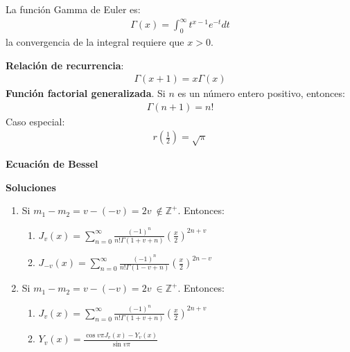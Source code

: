 \documentclass[a4paper,12pt]{article}
\begin{document}
\begin{tcolorbox}[colback=gray!15,colframe=red!1!red,title=Función Gamma]
La función Gamma de Euler es: 
\begin{gather*}
    \Gamma(x)=\int_0^\infty t^{x-1}e^{-t}dt 
\end{gather*}
la convergencia de la integral requiere que $x>0$.\newline

\textbf{Relación de recurrencia}: 
\begin{gather*}
    \Gamma(x+1)= x\Gamma(x) 
\end{gather*}\newline 
\textbf{Función factorial generalizada}. Si $n$ es un número entero positivo, entonces: 
\begin{gather*}
    \Gamma(n+1)= n!
\end{gather*}
Caso especial: 
\begin{gather*}
    r\left(\frac{1}{2}\right) = \sqrt{\pi}
\end{gather*}
\end{tcolorbox}
\begin{tcolorbox}[colback=gray!15,colframe=red!1!red,title=Ecuaciones de Bessel]
\textbf{Ecuación de Bessel}
\begin{center}
\end{center}
\textbf{Soluciones}
\begin{enumerate}
    \item Si $m_1-m_2=v-(-v)=2v\ \not\in \mathbb{Z}^+$. Entonces: 
    \begin{enumerate}
        \item $J_v(x)=\sum_{n=0}^{\infty}\frac{(-1)^n}{n!\Gamma(1+v+n)}\left(\frac{x}{2}\right)^{2n+v}$
        \item $J_{-v}(x)=\sum_{n=0}^{\infty}\frac{(-1)^n}{n!\Gamma(1-v+n)}\left(\frac{x}{2}\right)^{2n-v}$
    \end{enumerate}
    \begin{center}
    \end{center}
   \item Si $m_1-m_2=v-(-v)=2v\ \in \mathbb{Z}^+$. Entonces: 
    \begin{enumerate}
        \item $J_v(x)=\sum_{n=0}^{\infty}\frac{(-1)^n}{n!\Gamma(1+v+n)}\left(\frac{x}{2}\right)^{2n+v}$
        \item $Y_v(x)= \frac{\cos v\pi J_v(x)-Y_v(x)}{\sin v\pi}$
    \end{enumerate}
    \begin{center}
    \end{center}
\end{enumerate}

\end{tcolorbox}
\end{document}
